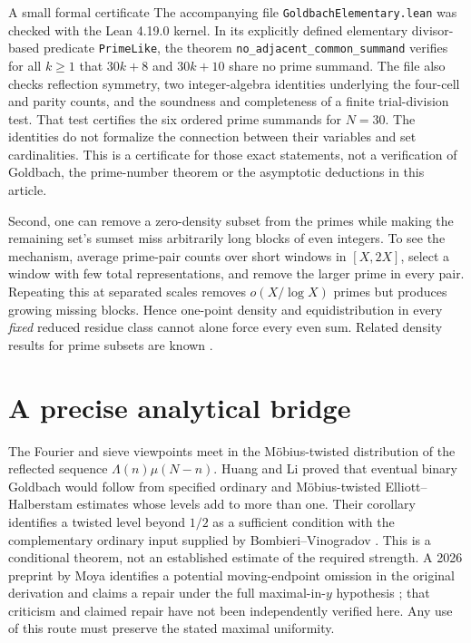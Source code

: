 \documentclass[11pt,a4paper]{article}
\begin{document}
\begin{insight}{A small formal certificate}
The accompanying file \texttt{GoldbachElementary.lean} was checked with the Lean 4.19.0 kernel. In its explicitly defined elementary divisor-based predicate \texttt{PrimeLike}, the theorem \texttt{no\_adjacent\_common\_summand} verifies for all $k\ge1$ that $30k+8$ and $30k+10$ share no prime summand. The file also checks reflection symmetry, two integer-algebra identities underlying the four-cell and parity counts, and the soundness and completeness of a finite trial-division test. That test certifies the six ordered prime summands for $N=30$. The identities do not formalize the connection between their variables and set cardinalities. This is a certificate for those exact statements, not a verification of Goldbach, the prime-number theorem or the asymptotic deductions in this article.
\end{insight}

Second, one can remove a zero-density subset from the primes while making the remaining set's sumset miss arbitrarily long blocks of even integers. To see the mechanism, average prime-pair counts over short windows in $[X,2X]$, select a window with few total representations, and remove the larger prime in every pair. Repeating this at separated scales removes $o(X/\log X)$ primes but produces growing missing blocks. Hence one-point density and equidistribution in every \emph{fixed} reduced residue class cannot alone force every even sum. Related density results for prime subsets are known \cite{density}.

\section{A precise analytical bridge}
The Fourier and sieve viewpoints meet in the M\"obius-twisted distribution of the reflected sequence $\Lambda(n)\mu(N-n)$. Huang and Li proved that eventual binary Goldbach would follow from specified ordinary and M\"obius-twisted Elliott--Halberstam estimates whose levels add to more than one. Their corollary identifies a twisted level beyond $1/2$ as a sufficient condition with the complementary ordinary input supplied by Bombieri--Vinogradov \cite{huangli}. This is a conditional theorem, not an established estimate of the required strength. A 2026 preprint by Moya identifies a potential moving-endpoint omission in the original derivation and claims a repair under the full maximal-in-$y$ hypothesis \cite{moya}; that criticism and claimed repair have not been independently verified here. Any use of this route must preserve the stated maximal uniformity.
\end{document}
